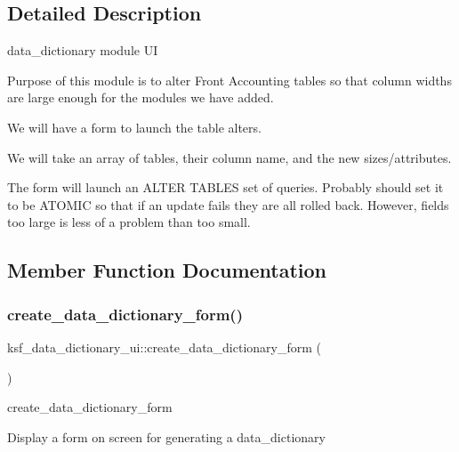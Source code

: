 \subsection{Detailed Description}
data\+\_\+dictionary module UI \begin{DoxyVerb}Purpose of this module is to alter Front Accounting tables
so that column widths are large enough for the modules
we have added.

We will have a form to launch the table alters.

We will take an array of tables, their column name,
and the new sizes/attributes.

The form will launch an ALTER TABLES set of queries.
Probably should set it to be ATOMIC so that if an update
fails they are all rolled back.  However, fields too large
is less of a problem than too small.\end{DoxyVerb}
 

\subsection{Member Function Documentation}
\hypertarget{classksf__data__dictionary__ui_ac0d782167419454b7bbba4a8aa3e98e1}{}\label{classksf__data__dictionary__ui_ac0d782167419454b7bbba4a8aa3e98e1} 
\subsubsection{\texorpdfstring{create\+\_\+data\+\_\+dictionary\+\_\+form()}{create\_data\_dictionary\_form()}\hspace{0.1cm}{\footnotesize\ttfamily [1/2]}}
{\footnotesize\ttfamily ksf\+\_\+data\+\_\+dictionary\+\_\+ui\+::create\+\_\+data\+\_\+dictionary\+\_\+form (\begin{DoxyParamCaption}{ }\end{DoxyParamCaption})}

create\+\_\+data\+\_\+dictionary\+\_\+form

Display a form on screen for generating a data\+\_\+dictionary \hypertarget{classksf__data__dictionary__ui_ac0d782167419454b7bbba4a8aa3e98e1}{}\label{classksf__data__dictionary__ui_ac0d782167419454b7bbba4a8aa3e98e1} 
